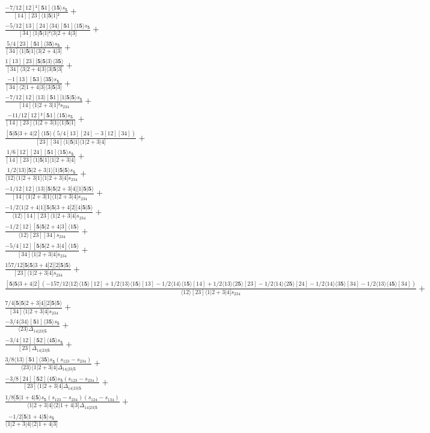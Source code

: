 \documentclass[varwidth, border=5pt]{standalone}
\begin{document}
\begin{my}
$\begin{gathered}
\scriptscriptstyle\frac{-7/12[12]²[𝟓1]⟨1𝟓⟩s_{𝟓}}{[14][23]⟨1|𝟓|1]²} +\\
\scriptscriptstyle\frac{-5/12[13][24]⟨34⟩[𝟓1]⟨1𝟓⟩s_{𝟓}}{[34]⟨1|𝟓|1]²⟨3|2+4|3]} +\\
\scriptscriptstyle\frac{5/4[23][𝟓1]⟨3𝟓⟩s_{𝟓}}{[34]⟨1|𝟓|1]⟨3|2+4|3]} +\\
\scriptscriptstyle\frac{1[13][23][𝟓|𝟓|3⟩⟨3𝟓⟩}{[34]⟨3|2+4|3]⟨3|𝟓|3]} +\\
\scriptscriptstyle\frac{-1[13][𝟓3]⟨3𝟓⟩s_{𝟓}}{[34]⟨2|1+4|3]⟨3|𝟓|3]} +\\
\scriptscriptstyle\frac{-7/12[12]⟨13⟩[𝟓1][1|𝟓|𝟓⟩s_{𝟓}}{[14]⟨1|2+3|1]²s_{234}} +\\
\scriptscriptstyle\frac{-11/12[12]²[𝟓1]⟨1𝟓⟩s_{𝟓}}{[14][23]⟨1|2+3|1]⟨1|𝟓|1]} +\\
\scriptscriptstyle\frac{[𝟓|𝟓|3+4|2]⟨1𝟓⟩(5/4[13][24]-3[12][34])}{[23][34]⟨1|𝟓|1]⟨1|2+3|4]} +\\
\scriptscriptstyle\frac{1/6[12][24][𝟓1]⟨1𝟓⟩s_{𝟓}}{[14][23]⟨1|𝟓|1]⟨1|2+3|4]} +\\
\scriptscriptstyle\frac{1/2⟨13⟩[𝟓|2+3|1⟩[1|𝟓|𝟓⟩s_{𝟓}}{⟨12⟩⟨1|2+3|1]⟨1|2+3|4]s_{234}} +\\
\scriptscriptstyle\frac{-1/12[12]⟨13⟩[𝟓|𝟓|2+3|4][1|𝟓|𝟓⟩}{[14]⟨1|2+3|1]⟨1|2+3|4]s_{234}} +\\
\scriptscriptstyle\frac{-1/2⟨1|2+4|1][𝟓|𝟓|3+4|2][4|𝟓|𝟓⟩}{⟨12⟩[14][23]⟨1|2+3|4]s_{234}} +\\
\scriptscriptstyle\frac{-1/2[12][𝟓|𝟓|2+4|3]⟨1𝟓⟩}{⟨12⟩[23][34]s_{234}} +\\
\scriptscriptstyle\frac{-5/4[12][𝟓|𝟓|2+3|4]⟨1𝟓⟩}{[34]⟨1|2+3|4]s_{234}} +\\
\scriptscriptstyle\frac{157/12[𝟓|𝟓|3+4|2][2|𝟓|𝟓⟩}{[23]⟨1|2+3|4]s_{234}} +\\
\scriptscriptstyle\frac{[𝟓|𝟓|3+4|2](-157/12⟨12⟩⟨1𝟓⟩[12]+1/2⟨13⟩⟨1𝟓⟩[13]-1/2⟨14⟩⟨1𝟓⟩[14]+1/2⟨13⟩⟨2𝟓⟩[23]-1/2⟨14⟩⟨2𝟓⟩[24]-1/2⟨14⟩⟨3𝟓⟩[34]-1/2⟨13⟩⟨4𝟓⟩[34])}{⟨12⟩[23]⟨1|2+3|4]s_{234}} +\\
\scriptscriptstyle\frac{7/4[𝟓|𝟓|2+3|4][2|𝟓|𝟓⟩}{[34]⟨1|2+3|4]s_{234}} +\\
\scriptscriptstyle\frac{-3/4⟨34⟩[𝟓1]⟨3𝟓⟩s_{𝟓}}{⟨23⟩Δ_{14|23|𝟓}} +\\
\scriptscriptstyle\frac{-3/4[12][𝟓2]⟨4𝟓⟩s_{𝟓}}{[23]Δ_{14|23|𝟓}} +\\
\scriptscriptstyle\frac{3/8⟨13⟩[𝟓1]⟨3𝟓⟩s_{𝟓}(s_{123}-s_{234})}{⟨23⟩⟨1|2+3|4]Δ_{14|23|𝟓}} +\\
\scriptscriptstyle\frac{-3/8[24][𝟓2]⟨4𝟓⟩s_{𝟓}(s_{123}-s_{234})}{[23]⟨1|2+3|4]Δ_{14|23|𝟓}} +\\
\scriptscriptstyle\frac{1/8[𝟓|1+4|𝟓⟩s_{𝟓}(s_{123}-s_{234})(s_{124}-s_{134})}{⟨1|2+3|4]⟨2|1+4|3]Δ_{14|23|𝟓}} +\\
\scriptscriptstyle\frac{-1/2[𝟓|1+4|𝟓⟩s_{𝟓}}{⟨1|2+3|4]⟨2|1+4|3]} \phantom{+}
\end{gathered}$
\end{my}
\end{document}
